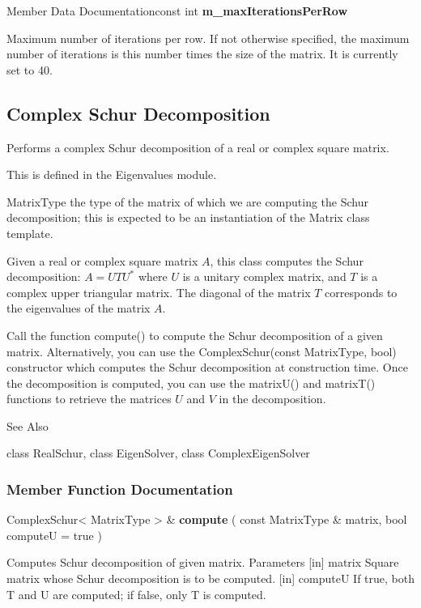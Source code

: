 \vspace{0.3cm}
Member Data Documentationconst int \textbf{m\_maxIterationsPerRow} 

Maximum number of iterations per row. 
If not otherwise specified, the maximum number of iterations is this number times the size of the matrix. It is currently set to 40. 











\newpage
\subsection{Complex Schur Decomposition}
\label{Complex Schur Decomposition}

Performs a complex Schur decomposition of a real or complex square matrix. 

This is defined in the Eigenvalues module.

MatrixType the type of the matrix of which we are computing the Schur decomposition; this is expected to be an instantiation of the Matrix class template. 

Given a real or complex square matrix $A$, this class computes the Schur decomposition: $A = U T U^*$ where $U$ is a unitary complex matrix, and $T$ is a complex upper triangular matrix. The diagonal of the matrix $T$ corresponds to the eigenvalues of the matrix $A$.

Call the function compute() to compute the Schur decomposition of a given matrix. Alternatively, you can use the ComplexSchur(const MatrixType, bool) constructor which computes the Schur decomposition at construction time. Once the decomposition is computed, you can use the matrixU() and matrixT() functions to retrieve the matrices $U$ and $V$ in the decomposition.


See Also

class RealSchur, class EigenSolver, class ComplexEigenSolver 


\subsubsection{Member Function Documentation}

ComplexSchur< MatrixType > \& \textbf{compute}  ( const MatrixType \&  matrix,    bool  computeU = true  )   

Computes Schur decomposition of given matrix. 
Parameters
[in] matrix Square matrix whose Schur decomposition is to be computed.  
[in] computeU If true, both T and U are computed; if false, only T is computed. 

